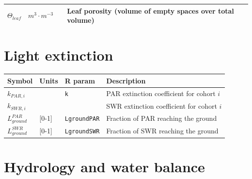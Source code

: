 \documentclass[]{book}
\begin{document}
\begin{longtable}[]{@{}llll@{}}
\begin{minipage}[t]{0.11\columnwidth}\raggedright\strut
\(\Theta_{leaf}\)\strut
\end{minipage} & \begin{minipage}[t]{0.10\columnwidth}\raggedright\strut
\(m^3 \cdot m^{-3}\)\strut
\end{minipage} & \begin{minipage}[t]{0.12\columnwidth}\raggedright\strut
\strut
\end{minipage} & \begin{minipage}[t]{0.45\columnwidth}\raggedright\strut
Leaf porosity (volume of empty spaces over total volume)\strut
\end{minipage}\tabularnewline
\bottomrule
\end{longtable}

\section{Light extinction}\label{light-extinction}

\begin{longtable}[]{@{}llll@{}}
\toprule
Symbol & Units & R param & Description\tabularnewline
\midrule
\endhead
\(k_{PAR,i}\) & & \texttt{k} & PAR extinction coefficient for cohort
\(i\)\tabularnewline
\(k_{SWR,i}\) & & & SWR extinction coefficient for cohort
\(i\)\tabularnewline
\(L^{PAR}_{ground}\) & {[}0-1{]} & \texttt{LgroundPAR} & Fraction of PAR
reaching the ground\tabularnewline
\(L^{SWR}_{ground}\) & {[}0-1{]} & \texttt{LgroundSWR} & Fraction of SWR
reaching the ground\tabularnewline
\bottomrule
\end{longtable}

\section{Hydrology and water balance}\label{hydrology-and-water-balance}
\end{document}

